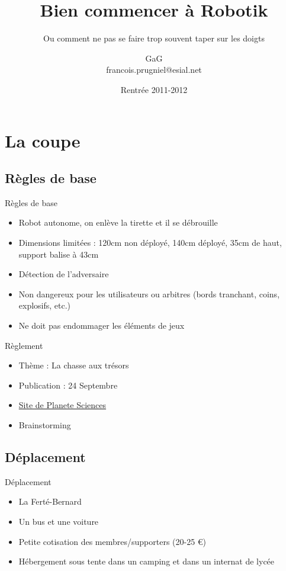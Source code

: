 \documentclass{beamer}
\title{Bien commencer à Robotik}
\subtitle{Ou comment ne pas se faire trop souvent taper sur les doigts}
\author{GaG \\ francois.prugniel@esial.net}
\date{Rentrée 2011-2012}
\begin{document}
\begin{frame}
	\titlepage
\end{frame}

\begin{frame}
	\tableofcontents[hideallsubsections]
\end{frame}

\section{La coupe}
\subsection{Règles de base}
\begin{frame}{Règles de base}
	\begin{itemize}
		\item Robot autonome, on enlève la tirette et il se débrouille
		\item Dimensions limitées : 120cm non déployé, 140cm déployé, 35cm de haut, support balise à 43cm
		\item Détection de l'adversaire
		\item Non dangereux pour les utilisateurs ou arbitres (bords tranchant, coins, explosifs, etc.)
		\item Ne doit pas endommager les éléments de jeux
	\end{itemize}
\end{frame}

\begin{frame}{Règlement}
	\begin{itemize}
		\item Thème : La chasse aux trésors
		\item Publication : 24 Septembre
		\item \href{http://www.planete-sciences.org/}{Site de Planete Sciences}
		\item Brainstorming
	\end{itemize}
\end{frame}

\subsection{Déplacement}
\begin{frame}{Déplacement}
	\begin{itemize}
		\item La Ferté-Bernard
		\item Un bus et une voiture
		\item Petite cotisation des membres/supporters (20-25 \euro)
		\item Hébergement sous tente dans un camping et dans un internat de lycée
	\end{itemize}
\end{frame}
\end{document}
